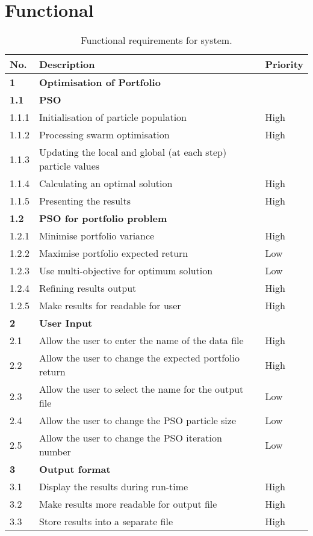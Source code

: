 \documentclass{pdfmx4020}
\begin{document}
  \section{Functional} %
  \label{sec:functional}
  \begin{table}[ht]
    \setlength{\extrarowheight}{2.0pt}
    \begin{tabular}{|l|l|l|}
      \hline
      No. & Description & Priority \\
      \hline
      \textbf{1} & \textbf{Optimisation of Portfolio} & \\
      \hline 
      \textbf{1.1} & \textbf{PSO} & \\
      \hline 
      1.1.1 & Initialisation of particle population & High \\
      \hline 
      1.1.2 & Processing swarm optimisation & High \\
      \hline 
      1.1.3 & Updating the local and global (at each step) particle values& \\
      \hline 
      1.1.4 & Calculating an optimal solution & High \\
      \hline 
      1.1.5 & Presenting the results & High \\
      \hline 
      \textbf{1.2} & \textbf{PSO for portfolio problem } & \\
      \hline 
      1.2.1 & Minimise portfolio variance & High \\
      \hline 
      1.2.2 & Maximise portfolio expected return & Low \\
      \hline 
      1.2.3 & Use multi-objective for optimum solution & Low \\
      \hline 
      1.2.4 & Refining results output & High \\
      \hline 
      1.2.5 & Make results for readable for user & High \\
      \hline 
      \textbf{2} & \textbf{User Input} & \\
      \hline
      2.1 & Allow the user to enter the name of the data file & High \\
      \hline
      2.2 & Allow the user to change the expected portfolio return & High \\
      \hline 
      2.3 & Allow the user to select the name for the output file & Low \\
      \hline 
      2.4 & Allow the user to change the PSO particle size & Low \\
      \hline 
      2.5 & Allow the user to change the PSO iteration number & Low \\
      \hline
      \textbf{3} &\textbf{Output format} & \\
      \hline 
      3.1 & Display the results during run-time & High \\
      \hline 
      3.2 & Make results more readable for output file & High \\
      \hline
      3.3 & Store results into a separate file & High \\
      \hline
    \end{tabular}
    \caption{Functional requirements for system.}
    \label{table:functionalRequirements}
  \end{table}
  
\end{document}
